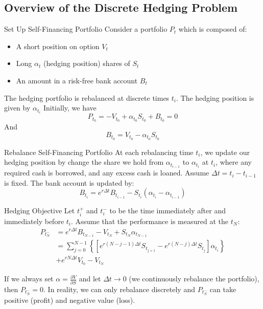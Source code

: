 \documentclass[10pt,table,mathserif]{beamer}
\begin{document}
\subsection{Overview of the Discrete Hedging Problem}
\begin{frame}{Set Up Self-Financing Portfolio}
Consider a portfolio $P_{t}$ which is composed of:
\begin{itemize}
	\item A short position on option $V_t$
	\item Long $\alpha_t$ (hedging position) shares of $S_t$
	\item An amount in a risk-free bank account $B_t$
\end{itemize}
The hedging portfolio is rebalanced at discrete times $t_i$. The hedging position is given by $\alpha_{t_i}$
Initially, we have
\[
P_{t_0}=  -V_{t_0}+\alpha_{t_0} S_{t_0}+ B_{t_0}=0
\]
And
\[
B_{t_0}=V_{t_0}-\alpha_{t_0} S_{t_0}
\]
\end{frame}

\begin{frame}{Rebalance Self-Financing Portfolio}
At each rebalancing time $t_i$, we update our hedging position by change the share we hold from $\alpha_{t_{i-1}}$ to $\alpha_{t_i}$ at $t_i$, where any required cash is borrowed, and any excess cash is loaned. Assume $\Delta t=t_{i}-t_{i-1}$ is fixed.
The bank account is updated by:
\[
B_{t_{i}}=e^{r \Delta t} B_{t_{i-1}}-S_{t_i}(\alpha_{t_i}-\alpha_{t_{i-1}})
\]
\end{frame}


\begin{frame}{Hedging Objective}
Let $t_i^+$ and $t_i^-$  to be the time immediately after  and immediately before $t_i$. Assume that the performance is measured at the $t_N$:
\[ \begin{split}
P_{t_N^-}&=e^{r \Delta t} B_{t_{N-1}}- V_{t_N}+ S_{t_N} \alpha_{t_{N-1}}  \\
&=\sum_{j=0}^{N-1}\left\{ \left[e^{r (N-j-1) \Delta t} S_{t_{j+1}}-e^{r (N-j) \Delta t}S_{t_{j}}\right] \alpha_{t_i} \right\}\\
&+e^{r N \Delta t} V_{t_0}-V_{t_N}
\end{split}
\]

If we always set $\alpha=\frac{\partial V}{\partial S}$ and let $\Delta t \rightarrow 0$ (we continuously rebalance the portfolio), then $P_{t_N^-}=0$. In reality, we can only rebalance discretely and  $P_{t_N^-}$ can take positive (profit) and negative value (loss).
\end{frame}
\end{document}
